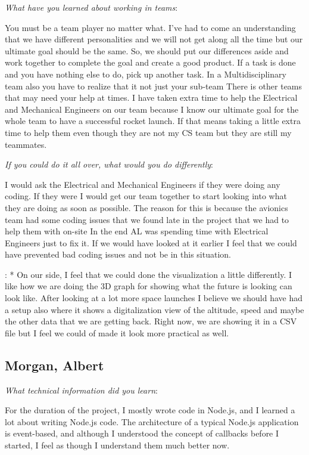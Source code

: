 \documentclass[10pt,draftclsnofoot,onecolumn]{IEEEtran}
\newcommand{\subsubsubsection}[1]{
	\hfill\break\textit{#1}:
}
\begin{document}
\subsubsubsection{What have you learned about working in teams}
You must be a team player no matter what.  I’ve had to come an understanding that we have different personalities and we will not get along all the time but our ultimate goal should be the same. So, we should put our differences aside and work together to complete the goal and create a good product.  If a task is done and you have nothing else to do, pick up another task.  In a Multidisciplinary team also you have to realize that it not just your sub-team  There is other teams that may need your help at times.  I have taken extra time to help the Electrical and Mechanical Engineers on our team because I know our ultimate goal for the whole team to have a successful rocket launch.  If that means taking a little extra time to help them even though they are not my CS team but they are still my teammates. 

\subsubsubsection{If you could do it all over, what would you do differently}
I would ask the Electrical and Mechanical Engineers if they were doing any coding.  If they were I would get our team together to start looking into what they are doing as soon as possible.  The reason for this is because the avionics team had some coding issues that we found late in the project that we had to help them with on-site  In the end AL was spending time with Electrical Engineers just to fix it.  If we would have looked at it earlier I feel that we could have prevented bad coding issues and not be in this situation.

\subsubsubsection{}*  
On our side, I feel that we could done the visualization a little differently.  I like how we are doing the 3D graph for showing what the future is looking can look like.  After looking at a lot more space launches I believe we should have had a setup also where it shows a digitalization view of the altitude, speed and maybe the other data that we are getting back.  Right now, we are showing it in a CSV file but I feel we could of made it look more practical as well. 

\subsection{Morgan, Albert}



\subsubsubsection{What technical information did you learn}
For the duration of the project, I mostly wrote code in Node.js, and I learned a lot about writing Node.js code.
The architecture of a typical Node.js application is event-based, and although I understood the concept of callbacks before I started,
I feel as though I understand them much better now.
\end{document}
